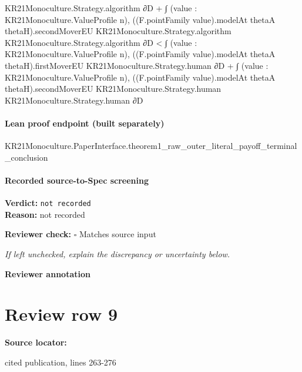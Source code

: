 \documentclass[10pt]{article}
\newcommand{\reviewerbox}{%
  \par\noindent\fbox{\parbox{0.96\linewidth}{\rule{0pt}{0.38in}}}\par
}
\newcommand{\reviewmatch}[1]{%
  \par\noindent\textbf{Reviewer check:} $\square$\; #1\par
  \noindent\emph{If left unchecked, explain the discrepancy or uncertainty below.}\par
}
\begin{document}
\begin{ReviewVerbatim}
                                                              KR21Monoculture.Strategy.algorithm ∂D +
                                                          ∫ (value : KR21Monoculture.ValueProfile n),
                                                            ((F.pointFamily value).modelAt thetaA thetaH).secondMoverEU
                                                              KR21Monoculture.Strategy.algorithm
                                                              KR21Monoculture.Strategy.algorithm ∂D <
                                                        ∫ (value : KR21Monoculture.ValueProfile n),
                                                            ((F.pointFamily value).modelAt thetaA thetaH).firstMoverEU
                                                              KR21Monoculture.Strategy.human ∂D +
                                                          ∫ (value : KR21Monoculture.ValueProfile n),
                                                            ((F.pointFamily value).modelAt thetaA thetaH).secondMoverEU
                                                              KR21Monoculture.Strategy.human
                                                              KR21Monoculture.Strategy.human ∂D
\end{ReviewVerbatim}

\paragraph{Lean proof endpoint (built separately)}\begin{ReviewVerbatim}
KR21Monoculture.PaperInterface.theorem1_raw_outer_literal_payoff_terminal_conclusion
\end{ReviewVerbatim}

\paragraph{Recorded source-to-Spec screening}
\textbf{Verdict:} \texttt{not recorded}
\\
\textbf{Reason:} not recorded
\reviewmatch{Matches source input}
\noindent\textbf{Reviewer annotation}\par
\reviewerbox
\clearpage
\hypertarget{source-claim-0a74bbe90425faa9}{}
\section*{Review row 9}
\textbf{Source locator:} {\footnotesize\raggedright cited publication, lines 263-\allowbreak{}276\par}
\end{document}
